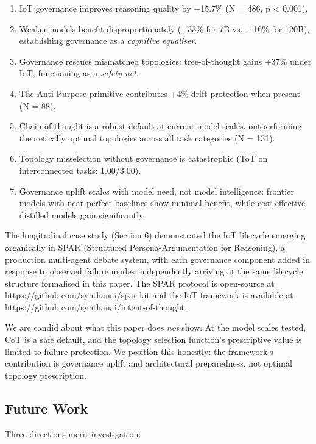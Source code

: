 \documentclass[11pt,a4paper]{article}
\providecommand{\tightlist}{%
  \setlength{\itemsep}{0pt}\setlength{\parskip}{0pt}}
\begin{document}
\begin{enumerate}
\def\labelenumi{\arabic{enumi}.}
\tightlist
\item
  IoT governance improves reasoning quality by +15.7\% (N = 486, p
  \textless{} 0.001).
\item
  Weaker models benefit disproportionately (+33\% for 7B vs.~+16\% for
  120B), establishing governance as a \emph{cognitive equaliser}.
\item
  Governance rescues mismatched topologies: tree-of-thought gains +37\%
  under IoT, functioning as a \emph{safety net}.
\item
  The Anti-Purpose primitive contributes +4\% drift protection when
  present (N = 88).
\item
  Chain-of-thought is a robust default at current model scales,
  outperforming theoretically optimal topologies across all task
  categories (N = 131).
\item
  Topology misselection without governance is catastrophic (ToT on
  interconnected tasks: 1.00/3.00).
\item
  Governance uplift scales with model need, not model intelligence:
  frontier models with near-perfect baselines show minimal benefit,
  while cost-effective distilled models gain significantly.
\end{enumerate}

The longitudinal case study (Section 6) demonstrated the IoT lifecycle
emerging organically in SPAR (Structured Persona-Argumentation for
Reasoning), a production multi-agent debate system, with each governance
component added in response to observed failure modes, independently
arriving at the same lifecycle structure formalised in this paper. The
SPAR protocol is open-source at https://github.com/synthanai/spar-kit
and the IoT framework is available at
https://github.com/synthanai/intent-of-thought.

We are candid about what this paper does \emph{not} show. At the model
scales tested, CoT is a safe default, and the topology selection
function's prescriptive value is limited to failure protection. We
position this honestly: the framework's contribution is governance
uplift and architectural preparedness, not optimal topology
prescription.

\subsection{Future Work}\label{future-work}

Three directions merit investigation:
\end{document}
